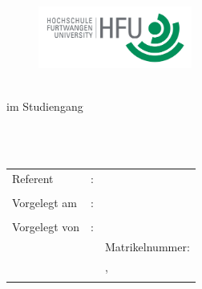 \begin{titlepage}
\pagestyle{empty}


\begin{figure}[ht]
	\begin{flushright}
		\includegraphics[width=0.45\textwidth]{content/pictures/hfu.jpg}
	\end{flushright}
\end{figure}

\begin{center}
{\fontsize{18}{22} \selectfont \docArtDerArbeit}\\[5mm]
{\fontsize{18}{22} \selectfont im Studiengang} \\[5mm]
{\fontsize{18}{22} \selectfont \docStudiengang}\\
\vspace{1cm}
\begin{onehalfspace}
{\fontsize{22}{26} \selectfont \textbf{\docTitle}}\\[5mm]
{\fontsize{18}{22} \selectfont \docUntertitle}


\end{onehalfspace}
\end{center}

\vfill
\begin{center}
\begin{tabular}{lcl}
Referent 		&:& \docErsterReferent 	\\ \\
Vorgelegt am 	&:& \docAbgabedatum 	\\ \\
Vorgelegt von 	&:& \docVorname~\docNachname\\
				& & Matrikelnummer: \docMatrikelnummer\\
				& & \docStrasse,~\docPlz~\docOrt	\\
				& & \docEmail			
\end{tabular}
\end{center}
\end{titlepage}